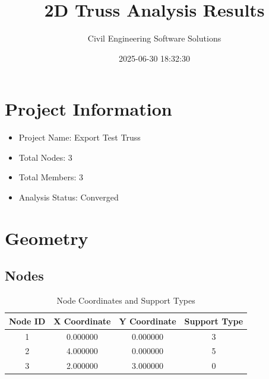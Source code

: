 \documentclass{article}
\title{2D Truss Analysis Results}
\author{Civil Engineering Software Solutions}
\date{2025-06-30 18:32:30}
\begin{document}
\maketitle

\section{Project Information}
\begin{itemize}
\item Project Name: Export Test Truss
\item Total Nodes: 3
\item Total Members: 3
\item Analysis Status: Converged
\end{itemize}

\section{Geometry}
\subsection{Nodes}
\begin{table}[h]
\centering
\begin{tabular}{cccc}
\toprule
Node ID & X Coordinate & Y Coordinate & Support Type \\
\midrule
1 & 0.000000 & 0.000000 & 3 \\
2 & 4.000000 & 0.000000 & 5 \\
3 & 2.000000 & 3.000000 & 0 \\
\bottomrule
\end{tabular}
\caption{Node Coordinates and Support Types}
\end{table}
\end{document}
